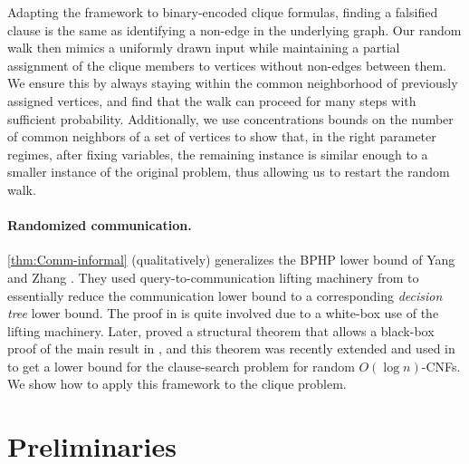 \documentclass[10pt,a4paper]{article}
\theoremstyle{definition}
\theoremstyle{remark}
\theoremstyle{example}
\theoremstyle{plain}
\newcommand{\myparagraph}[1]{\paragraph{#1}}
\begin{document}
Adapting the framework to binary-encoded clique formulas, finding a falsified clause is the same as identifying a non-edge in the underlying graph. 
Our random walk then mimics a uniformly drawn input while maintaining a partial assignment of the clique members to vertices without non-edges between them.
We ensure this by always staying within the common neighborhood of previously assigned vertices,
and find that the walk can proceed for many steps with sufficient probability. 
Additionally, we use concentrations bounds on the number of common neighbors of a set of vertices to show that, in the right parameter regimes,
after fixing variables, the remaining instance 
is similar enough to a smaller instance of the original problem, thus allowing us to restart the random walk. 
\myparagraph{Randomized communication.} 
\cref{thm:Comm-informal} (qualitatively) generalizes the BPHP lower bound of Yang and Zhang \cite{YZ24Comm}. They used query-to-communication lifting machinery from \cite{GPW20} to essentially reduce the communication lower bound to a corresponding \emph{decision tree} lower bound. The proof in \cite{YZ24Comm} is quite involved due to a white-box use of the lifting machinery.
Later, \cite{GoosGJL2025quantum} proved a structural theorem that allows a black-box proof of the main result in \cite{YZ24Comm}, and this 
theorem was recently extended and used in \cite{RiazanovSSY2025searching} to get a lower bound for the clause-search problem for random $O(\log n)$-CNFs. 
We show how to apply this framework to the clique problem.

\section{Preliminaries}
\label{sec:preliminaries}
\end{document}
